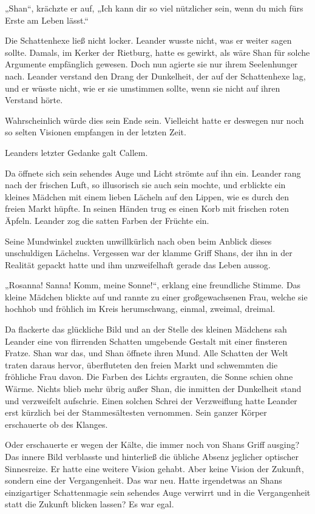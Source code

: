 \documentclass[10pt, a4paper, oneside]{book}
\begin{document}
„Shan“, krächzte er auf, „Ich kann dir so viel nützlicher sein, wenn du mich fürs Erste am Leben lässt.“

Die Schattenhexe ließ nicht locker. Leander wusste nicht, was er weiter sagen sollte. Damals, im Kerker der Rietburg, hatte es gewirkt, als wäre Shan für solche Argumente empfänglich gewesen. Doch nun agierte sie nur ihrem Seelenhunger nach. Leander verstand den Drang der Dunkelheit, der auf der Schattenhexe lag, und er wüsste nicht, wie er sie umstimmen sollte, wenn sie nicht auf ihren Verstand hörte.

Wahrscheinlich würde dies sein Ende sein. Vielleicht hatte er deswegen nur noch so selten Visionen empfangen in der letzten Zeit.

Leanders letzter Gedanke galt Callem.\bigskip







Da öffnete sich sein sehendes Auge und Licht strömte auf ihn ein. Leander rang nach der frischen Luft, so illusorisch sie auch sein mochte, und erblickte ein kleines Mädchen mit einem lieben Lächeln auf den Lippen, wie es durch den freien Markt hüpfte. In seinen Händen trug es einen Korb mit frischen roten Äpfeln. Leander zog die satten Farben der Früchte ein.

Seine Mundwinkel zuckten unwillkürlich nach oben beim Anblick dieses unschuldigen Lächelns. Vergessen war der klamme Griff Shans, der ihn in der Realität gepackt hatte und ihm unzweifelhaft gerade das Leben aussog.

„Rosanna! Sanna! Komm, meine Sonne!“, erklang eine freundliche Stimme. Das kleine Mädchen blickte auf und rannte zu einer großgewachsenen Frau, welche sie hochhob und fröhlich im Kreis herumschwang, einmal, zweimal, dreimal.

Da flackerte das glückliche Bild und an der Stelle des kleinen Mädchens sah Leander eine von flirrenden Schatten umgebende Gestalt mit einer finsteren Fratze. Shan war das, und Shan öffnete ihren Mund. Alle Schatten der Welt traten daraus hervor, überfluteten den freien Markt und schwemmten die fröhliche Frau davon. Die Farben des Lichts ergrauten, die Sonne schien ohne Wärme. Nichts blieb mehr übrig außer Shan, die inmitten der Dunkelheit stand und verzweifelt aufschrie. Einen solchen Schrei der Verzweiflung hatte Leander erst kürzlich bei der Stammesältesten vernommen. Sein ganzer Körper erschauerte ob des Klanges.

Oder erschauerte er wegen der Kälte, die immer noch von Shans Griff ausging? Das innere Bild verblasste und hinterließ die übliche Absenz jeglicher optischer Sinnesreize. Er hatte eine weitere Vision gehabt. Aber keine Vision der Zukunft, sondern eine der Vergangenheit. Das war neu. Hatte irgendetwas an Shans einzigartiger Schattenmagie sein sehendes Auge verwirrt und in die Vergangenheit statt die Zukunft blicken lassen? Es war egal.
\end{document}
